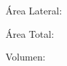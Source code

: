 \documentclass[12pt,addpoints]{repaso}
\begin{document}
\begin{questions}
{\begin{multicols}{2}
\begin{parts}
                        Área Lateral: \fillin[][0in]

                        \begin{solutionbox}{1cm}
                        \end{solutionbox}

                        Área Total: \fillin[][0in]

                        \begin{solutionbox}{1cm}
                        \end{solutionbox}

                        Volumen: \fillin[][0in]

                        \begin{solutionbox}{1cm}
                        \end{solutionbox}
                  \end{parts}
            \end{multicols}
      }




\end{questions}
\end{document}
